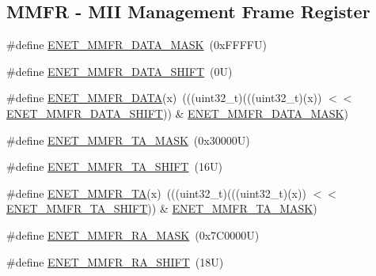 \subsection*{M\+M\+FR -\/ M\+II Management Frame Register}
\begin{DoxyCompactItemize}
\item 
\#define \mbox{\hyperlink{group___e_n_e_t___register___masks_ga9059e7e576983c3c51723ee135d4e244}{E\+N\+E\+T\+\_\+\+M\+M\+F\+R\+\_\+\+D\+A\+T\+A\+\_\+\+M\+A\+SK}}~(0x\+F\+F\+F\+F\+U)
\item 
\#define \mbox{\hyperlink{group___e_n_e_t___register___masks_gaa6293f53a8dbb48f6ae13d9ea7717293}{E\+N\+E\+T\+\_\+\+M\+M\+F\+R\+\_\+\+D\+A\+T\+A\+\_\+\+S\+H\+I\+FT}}~(0\+U)
\item 
\#define \mbox{\hyperlink{group___e_n_e_t___register___masks_gab9b153fc08d016ffe1c732b01889f1de}{E\+N\+E\+T\+\_\+\+M\+M\+F\+R\+\_\+\+D\+A\+TA}}(x)~(((uint32\+\_\+t)(((uint32\+\_\+t)(x)) $<$$<$ \mbox{\hyperlink{group___e_n_e_t___register___masks_gaa6293f53a8dbb48f6ae13d9ea7717293}{E\+N\+E\+T\+\_\+\+M\+M\+F\+R\+\_\+\+D\+A\+T\+A\+\_\+\+S\+H\+I\+FT}})) \& \mbox{\hyperlink{group___e_n_e_t___register___masks_ga9059e7e576983c3c51723ee135d4e244}{E\+N\+E\+T\+\_\+\+M\+M\+F\+R\+\_\+\+D\+A\+T\+A\+\_\+\+M\+A\+SK}})
\item 
\#define \mbox{\hyperlink{group___e_n_e_t___register___masks_gac8464f2aec3816fb4088c18ff6a85f54}{E\+N\+E\+T\+\_\+\+M\+M\+F\+R\+\_\+\+T\+A\+\_\+\+M\+A\+SK}}~(0x30000\+U)
\item 
\#define \mbox{\hyperlink{group___e_n_e_t___register___masks_ga9559ded561df2769ecd05aed1233943a}{E\+N\+E\+T\+\_\+\+M\+M\+F\+R\+\_\+\+T\+A\+\_\+\+S\+H\+I\+FT}}~(16\+U)
\item 
\#define \mbox{\hyperlink{group___e_n_e_t___register___masks_gafa7ca4280c54ec8d167eff14acf8cac2}{E\+N\+E\+T\+\_\+\+M\+M\+F\+R\+\_\+\+TA}}(x)~(((uint32\+\_\+t)(((uint32\+\_\+t)(x)) $<$$<$ \mbox{\hyperlink{group___e_n_e_t___register___masks_ga9559ded561df2769ecd05aed1233943a}{E\+N\+E\+T\+\_\+\+M\+M\+F\+R\+\_\+\+T\+A\+\_\+\+S\+H\+I\+FT}})) \& \mbox{\hyperlink{group___e_n_e_t___register___masks_gac8464f2aec3816fb4088c18ff6a85f54}{E\+N\+E\+T\+\_\+\+M\+M\+F\+R\+\_\+\+T\+A\+\_\+\+M\+A\+SK}})
\item 
\#define \mbox{\hyperlink{group___e_n_e_t___register___masks_ga3325bdb05d05a8ec384202a6537a7f9f}{E\+N\+E\+T\+\_\+\+M\+M\+F\+R\+\_\+\+R\+A\+\_\+\+M\+A\+SK}}~(0x7\+C0000\+U)
\item 
\#define \mbox{\hyperlink{group___e_n_e_t___register___masks_gacb92c97e6dc7b0e466141a7f7cb63f4d}{E\+N\+E\+T\+\_\+\+M\+M\+F\+R\+\_\+\+R\+A\+\_\+\+S\+H\+I\+FT}}~(18\+U)

\end{DoxyCompactItemize}
